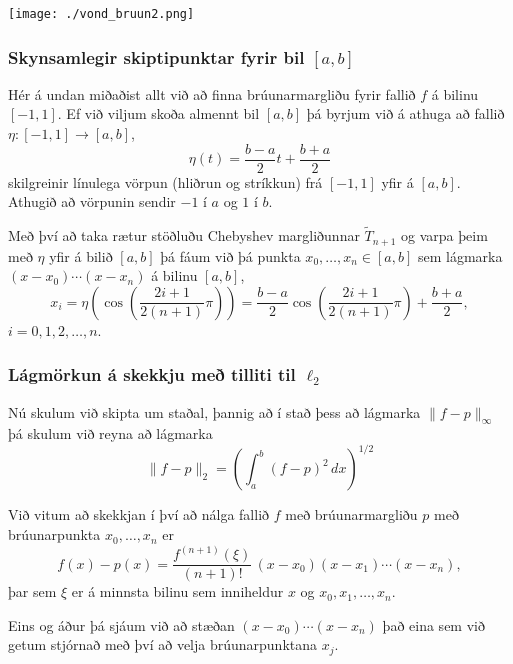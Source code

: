 \documentclass[icelandic,a4paper,12pt]{article}
\begin{document}
\begin{center}
 \texttt{[image: ./vond\_bruun2.png]}
\end{center}



\subsubsection{Skynsamlegir skiptipunktar fyrir bil $[a,b]$}
  Hér á undan miðaðist allt við að finna brúunarmargliðu fyrir fallið $f$ á bilinu
  $[-1,1]$. \pause
  Ef við viljum skoða almennt bil $[a,b]$ þá byrjum við á athuga að fallið 
  $\eta:[-1,1]\to [a,b]$, 
  $$
    \eta(t) = \frac{b-a}2 t + \frac{b+a}2
  $$
  skilgreinir línulega vörpun (hliðrun og stríkkun) frá $[-1,1]$ yfir á 
  $[a,b]$. \pause
  Athugið að vörpunin sendir $-1$ í $a$ og $1$ í $b$.
  \pause
  
  Með því að taka rætur stöðluðu Chebyshev margliðunnar $\tilde T_{n+1}$ 
  og varpa þeim með $\eta$ yfir á bilið $[a,b]$ þá fáum við þá punkta
  $x_0,\ldots,x_n \in [a,b]$ sem lágmarka 
  $(x-x_0)\cdots (x-x_n)$ á bilinu $[a,b]$,\pause
  $$
    x_i = \eta\left(\cos\left(\frac{2i+1}{2(n+1)}\pi\right)\right) 
    = \frac{b-a}2 \cos\left(\frac{2i+1}{2(n+1)}\pi\right) + \frac{b+a}2,
  $$
  $i=0,1,2,\ldots,n$.
 




\subsubsection{Lágmörkun á skekkju með tilliti til $\ell_2$}
 Nú skulum við skipta um staðal, þannig að í stað þess að lágmarka
 $\|f-p\|_\infty$ þá skulum við reyna að lágmarka
 $$
  \|f-p\|_2 = \left(\int_a^b (f-p)^2\, dx\right)^{1/2}
 $$
\pause 

  Við vitum að skekkjan í því að nálga fallið $f$ með brúunarmargliðu $p$
  með brúunarpunkta $x_0,\ldots,x_n$ er
  $$
    f(x)-p(x) = \frac{f^{(n+1)}(\xi)}{(n+1)!}\, (x-x_0)(x-x_1)\cdots (x-x_n),
  $$
  þar sem $\xi$ er á minnsta bilinu sem inniheldur $x$ og $x_0,x_1,\ldots,x_n$. \pause
  
  Eins og áður þá sjáum við að stæðan $(x-x_0)\cdots(x-x_n)$ það eina sem við getum stjórnað
  með því að velja brúunarpunktana $x_j$.
\end{document}
